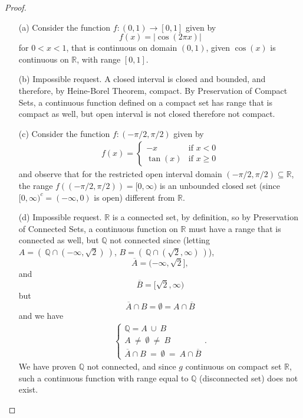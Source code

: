\documentclass[11pt,twoside, reqno]{amsart}
\theoremstyle{remark}
\def\R{\mathbb R}
\def\Q{\mathbb Q}
\begin{document}
\begin{proof}
\begin{enumerate}
    \item [(a)] Consider the function $f:(0,1) \to [0,1]$ given by
    $$
        f(x) = |\cos(2\pi x)|
    $$
    for $0 < x < 1$, that is continuous on domain $(0,1)$, given $\cos(x)$ is continuous on $\R$, with range $[0,1]$.
    \item [(b)] Impossible request. A closed interval is closed and bounded, and therefore, by Heine-Borel Theorem, compact. By Preservation of Compact Sets, a continuous function defined on a compact set has range that is compact as well, but open interval is not closed therefore not compact.
    \item [(c)] Consider the function $f:(-\pi/2,\pi/2)$ given by
    \begin{align*}
        f(x) = 
            \begin{cases}
            -x & \text{if $x < 0$} \\
            \tan(x) & \text{if $x \geq 0$}
            \end{cases}
    \end{align*}
    and observe that for the restricted open interval domain $(-\pi/2,\pi/2) \subseteq \R$, the range $f((-\pi/2,\pi/2)) = [0,\infty)$ is an unbounded closed set (since $[0,\infty)^c = (-\infty,0)$ is open) different from $\R$.
    \item [(d)] Impossible request. $\R$ is a connected set, by definition, so by Preservation of Connected Sets, a continuous function on $\R$ must have a range that is connected as well, but $\Q$ not connected since (letting $A = (~\Q \cap (-\infty,\sqrt{2})~)$, $B = (~\Q \cap (\sqrt{2},\infty)~)$),
    $$
        \overline{A} = (-\infty,\sqrt{2}],
    $$
    and
    $$
        \overline{B} = [\sqrt{2}, \infty)
    $$
    but
    $$
        \overline{A} \cap B = \emptyset = A \cap \overline{B}
    $$
    and we have
    \begin{align*}
        \begin{cases}
            \Q = A ~ \cup ~ B \\
            A ~ \neq ~ \emptyset ~ \neq ~ B \\
            \overline{A} \cap B ~ = ~ \emptyset ~ = ~ A \cap \overline{B}
        \end{cases}.
    \end{align*}
    We have proven $\Q$ not connected, and since $g$ continuous on compact set $\R$, such a continuous function with range equal to $\Q$ (disconnected set) does not exist.
\end{enumerate}

\end{proof}
\end{document}
